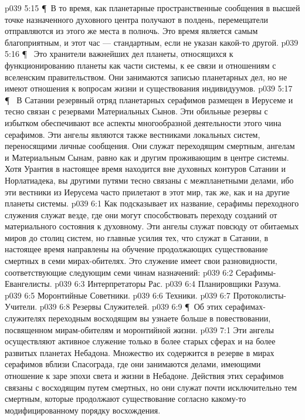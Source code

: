 \vs p039 5:15 \P\ В то время, как планетарные пространственные сообщения в высшей точке назначенного духовного центра получают в полдень, перемещатели отправляются из этого же места в полночь. Это время является самым благоприятным, и этот час --- стандартным, если не указан какой\hyp{}то другой.
\vs p039 5:16 \P\ \bibnobreakspace {} Это хранители важнейших дел планеты, относящихся к функционированию планеты как части системы, к ее связи и отношениям с вселенским правительством. Они занимаются записью планетарных дел, но не имеют отношения к вопросам жизни и существования индивидуумов.
\vs p039 5:17 \P\ \bibnobreakspace {} В Сатании резервный отряд планетарных серафимов размещен в Иерусеме и тесно связан с резервами Материальных Сынов. Эти обильные резервы с избытком обеспечивают все аспекты многообразной деятельности этого чина серафимов. Эти ангелы являются также вестниками локальных систем, переносящими личные сообщения. Они служат переходящим смертным, ангелам и Материальным Сынам, равно как и другим проживающим в центре системы. Хотя Урантия в настоящее время находится вне духовных контуров Сатании и Норлатиадека, вы другими путями тесно связаны с межпланетными делами, ибо эти вестники из Иерусема часто прилетают в этот мир, так же, как и на другие планеты системы.
\vs p039 6:1 Как подсказывает их название, серафимы переходного служения служат везде, где они могут способствовать переходу созданий от материального состояния к духовному. Эти ангелы служат повсюду от обитаемых миров до столиц систем, но главные усилия тех, что служат в Сатании, в настоящее время направлены на обучение продолжающих существование смертных в семи мирах\hyp{}обителях. Это служение имеет свои разновидности, соответствующие следующим семи чинам назначений:
\vs p039 6:2 \bibnobreakspace Серафимы\hyp{}Евангелисты.
\vs p039 6:3 \bibnobreakspace Интерпретаторы Рас.
\vs p039 6:4 \bibnobreakspace Планировщики Разума.
\vs p039 6:5 \bibnobreakspace Моронтийные Советники.
\vs p039 6:6 \bibnobreakspace Техники.
\vs p039 6:7 \bibnobreakspace Протоколисты\hyp{}Учители.
\vs p039 6:8 \bibnobreakspace Резервы Служителей.
\vs p039 6:9 \P\ Об этих серафимах\hyp{}служителях переходным восходящим вы узнаете больше в повествовании, посвященном мирам\hyp{}обителям и моронтийной жизни.
\vs p039 7:1 Эти ангелы осуществляют активное служение только в более старых сферах и на более развитых планетах Небадона. Множество их содержится в резерве в мирах серафимов вблизи Спасограда, где они занимаются делами, имеющими отношение к заре эпохи света и жизни в Небадоне. Действия этих серафимов связаны с восходящим путем смертных, но они служат почти исключительно тем смертным, которые продолжают существование согласно какому\hyp{}то модифицированному порядку восхождения.
